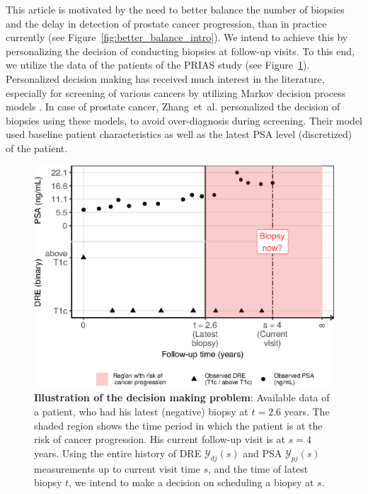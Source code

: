 This article is motivated by the need to better balance the number of biopsies and the delay in detection of prostate cancer progression, than in practice currently (see Figure~\ref{fig:better_balance_intro}). We intend to achieve this by personalizing the decision of conducting biopsies at follow-up visits. To this end, we utilize the data of the patients of the PRIAS study (see Figure~\ref{fig:obsDataPlot_2340}). Personalized decision making has received much interest in the literature, especially for screening of various cancers by utilizing Markov decision process models \cite{ayer2012or, akhavan2017markov,erenay2014optimizing}. In case of prostate cancer, Zhang~et~al.\cite{zhang2012optimization} personalized the decision of biopsies using these models, to avoid over-diagnosis during screening. Their model used baseline patient characteristics as well as the latest PSA level (discretized) of the patient.

\begin{figure}[!htb]
\captionsetup{justification=justified}
\centerline{\includegraphics[width=\columnwidth]{images/obsDataPlot_2340.eps}}
\caption{\textbf{Illustration of the decision making problem}: Available data of a patient, who had his latest (negative) biopsy at $t=2.6$ years. The shaded region shows the time period in which the patient is at the risk of cancer progression. His current follow-up visit is at $s=4$ years. Using the entire history of DRE $\mathcal{Y}_{dj}(s)$ and PSA $\mathcal{Y}_{pj}(s)$ measurements up to current visit time $s$, and the time of latest biopsy $t$, we intend to make a decision on scheduling a biopsy at $s$.}
\label{fig:obsDataPlot_2340}
\end{figure}

